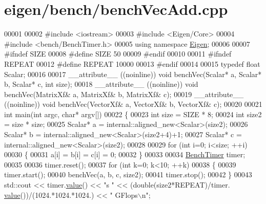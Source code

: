 \hypertarget{eigen_2bench_2bench_vec_add_8cpp_source}{}\section{eigen/bench/bench\+Vec\+Add.cpp}
\label{eigen_2bench_2bench_vec_add_8cpp_source}

\begin{DoxyCode}
00001 
00002 \textcolor{preprocessor}{#include <iostream>}
00003 \textcolor{preprocessor}{#include <Eigen/Core>}
00004 \textcolor{preprocessor}{#include <bench/BenchTimer.h>}
00005 \textcolor{keyword}{using namespace }\hyperlink{namespace_eigen}{Eigen};
00006 
00007 \textcolor{preprocessor}{#ifndef SIZE}
00008 \textcolor{preprocessor}{#define SIZE 50}
00009 \textcolor{preprocessor}{#endif}
00010 
00011 \textcolor{preprocessor}{#ifndef REPEAT}
00012 \textcolor{preprocessor}{#define REPEAT 10000}
00013 \textcolor{preprocessor}{#endif}
00014 
00015 \textcolor{keyword}{typedef} \textcolor{keywordtype}{float} Scalar;
00016 
00017 \_\_attribute\_\_ ((noinline)) \textcolor{keywordtype}{void} benchVec(Scalar* a, Scalar* b, Scalar* c, \textcolor{keywordtype}{int} size);
00018 \_\_attribute\_\_ ((noinline)) \textcolor{keywordtype}{void} benchVec(MatrixXf& a, MatrixXf& b, MatrixXf& c);
00019 \_\_attribute\_\_ ((noinline)) \textcolor{keywordtype}{void} benchVec(VectorXf& a, VectorXf& b, VectorXf& c);
00020 
00021 \textcolor{keywordtype}{int} main(\textcolor{keywordtype}{int} argc, \textcolor{keywordtype}{char}* argv[])
00022 \{
00023     \textcolor{keywordtype}{int} size = SIZE * 8;
00024     \textcolor{keywordtype}{int} size2 = size * size;
00025     Scalar* a = internal::aligned\_new<Scalar>(size2);
00026     Scalar* b = internal::aligned\_new<Scalar>(size2+4)+1;
00027     Scalar* c = internal::aligned\_new<Scalar>(size2); 
00028     
00029     \textcolor{keywordflow}{for} (\textcolor{keywordtype}{int} i=0; i<size; ++i)
00030     \{
00031         a[i] = b[i] = c[i] = 0;
00032     \}
00033     
00034     \hyperlink{class_eigen_1_1_bench_timer}{BenchTimer} timer;
00035     
00036     timer.reset();
00037     \textcolor{keywordflow}{for} (\textcolor{keywordtype}{int} k=0; k<10; ++k)
00038     \{
00039         timer.start();
00040         benchVec(a, b, c, size2);
00041         timer.stop();
00042     \}
00043     std::cout << timer.\hyperlink{class_eigen_1_1_bench_timer_a26760f963ed8b64c126159bfea57735e}{value}() << \textcolor{stringliteral}{"s  "} << (double(size2*REPEAT)/timer.
      \hyperlink{class_eigen_1_1_bench_timer_a26760f963ed8b64c126159bfea57735e}{value}())/(1024.*1024.*1024.) << \textcolor{stringliteral}{" GFlops\(\backslash\)n"};

\end{DoxyCode}
